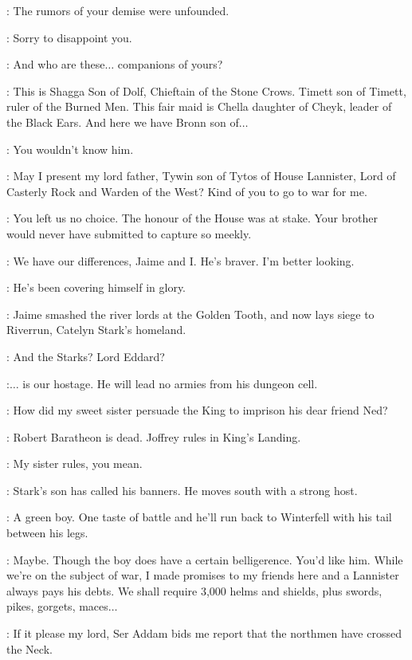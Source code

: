 \TYWIN: The rumors of your demise were unfounded. 

\TYRION: Sorry to disappoint you. 

\TYWIN: And who are these$\ldots$ companions of yours? 

\TYRION: This is Shagga Son of Dolf, Chieftain of the Stone Crows. Timett son of Timett, ruler of the Burned Men. This fair maid is Chella daughter of Cheyk, leader of the Black Ears. And here we have Bronn son of$\ldots$ 

\BRONN: You wouldn't know him. 

\TYRION: May I present my lord father, Tywin son of Tytos of House Lannister, Lord of Casterly Rock and Warden of the West? Kind of you to go to war for me. 

\TYWIN: You left us no choice. The honour of the House was at stake. Your brother would never have submitted to capture so meekly. 

\TYRION: We have our differences, Jaime and I. He's braver. I'm better looking. 

\TYWIN: He's been covering himself in glory. 

\KEVAN: Jaime smashed the river lords at the Golden Tooth, and now lays siege to Riverrun, Catelyn Stark's homeland. 

\TYRION: And the Starks? Lord Eddard? 

\TYWIN:$\ldots$ is our hostage. He will lead no armies from his dungeon cell. 

\TYRION: How did my sweet sister persuade the King to imprison his dear friend Ned? 

\TYWIN: Robert Baratheon is dead. Joffrey rules in King's Landing. 

\TYRION: My sister rules, you mean. 

\KEVAN: Stark's son has called his banners. He moves south with a strong host. 

\TYWIN: A green boy. One taste of battle and he'll run back to Winterfell with his tail between his legs. 

\TYRION: Maybe. Though the boy does have a certain belligerence. You'd like him. While we're on the subject of war, I made promises to my friends here and a Lannister always pays his debts. We shall require 3,000 helms and shields, plus swords, pikes, gorgets, maces$\ldots$  


\PAGE: If it please my lord, Ser Addam bids me report that the northmen have crossed the Neck. 

